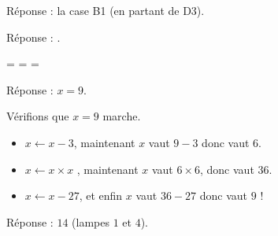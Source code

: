 \documentclass[class=report,crop=false, 12pt]{standalone}
\begin{document}






\begin{enigme}

Réponse : la case B1 (en partant de D3).

\end{enigme}




\begin{enigme}[Répéter]

Réponse : .

 =  \quad {}= \quad {}=


\end{enigme}



\begin{enigme}

Réponse : $x=9$.

Vérifions que $x=9$ marche.
    \begin{itemize}
      \item $x \leftarrow x-3$, maintenant $x$ vaut $9-3$ donc vaut $6$.
      \item $x \leftarrow x \times x$ , maintenant $x$ vaut $6 \times 6$, donc vaut $36$.
      \item $x \leftarrow x - 27$, et enfin $x$ vaut $36-27$ donc vaut $9$ !
    \end{itemize}
    
\end{enigme}





\begin{enigme}

Réponse : $14$ (lampes $1$ et $4$). 

\end{enigme}
\end{document}
